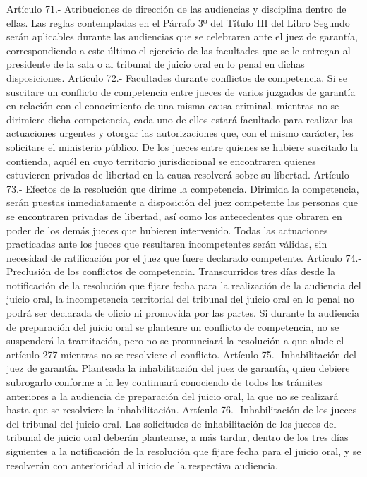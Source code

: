     Artículo 71.- Atribuciones de dirección de las audiencias y disciplina dentro de ellas. Las reglas contempladas en el Párrafo 3º del Título III del Libro Segundo serán aplicables durante las audiencias que se celebraren ante el juez de garantía, correspondiendo a este último el ejercicio de las facultades que se le entregan al presidente de la sala o al tribunal de juicio oral en lo penal en dichas disposiciones.
    Artículo 72.- Facultades durante conflictos de competencia. Si se suscitare un conflicto de competencia entre jueces de varios juzgados de garantía en relación con el conocimiento de una misma causa criminal, mientras no se dirimiere dicha competencia, cada uno de ellos estará facultado para realizar las actuaciones urgentes y otorgar las autorizaciones que, con el mismo carácter, les solicitare el ministerio público.
    De los jueces entre quienes se hubiere suscitado la contienda, aquél en cuyo territorio jurisdiccional se encontraren quienes estuvieren privados de libertad en la causa resolverá sobre su libertad.
    Artículo 73.- Efectos de la resolución que dirime la competencia. Dirimida la competencia, serán puestas inmediatamente a disposición del juez competente las personas que se encontraren privadas de libertad, así como los antecedentes que obraren en poder de los demás jueces que hubieren intervenido.
    Todas las actuaciones practicadas ante los jueces que resultaren incompetentes serán válidas, sin necesidad de ratificación por el juez que fuere declarado competente.
    Artículo 74.- Preclusión de los conflictos de competencia. Transcurridos tres días desde la notificación de la resolución que fijare fecha para la realización de la audiencia del juicio oral, la incompetencia territorial del tribunal del juicio oral en lo penal no podrá ser declarada de oficio ni promovida por las partes.
    Si durante la audiencia de preparación del juicio oral se planteare un conflicto de competencia, no se suspenderá la tramitación, pero no se pronunciará la resolución a que alude el artículo 277 mientras no se resolviere el conflicto.
    Artículo 75.- Inhabilitación del juez de garantía. Planteada la inhabilitación del juez de garantía, quien debiere subrogarlo conforme a la ley continuará conociendo de todos los trámites anteriores a la audiencia de preparación del juicio oral, la que no se realizará hasta que se resolviere la inhabilitación.
    Artículo 76.- Inhabilitación de los jueces del tribunal del juicio oral. Las solicitudes de inhabilitación de los jueces del tribunal de juicio oral deberán plantearse, a más tardar, dentro de los tres días siguientes a la notificación de la resolución que fijare fecha para el juicio oral, y se resolverán con anterioridad al inicio de la respectiva audiencia.
